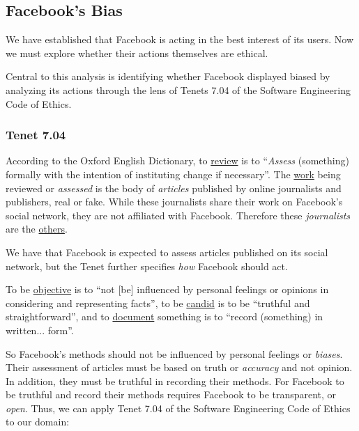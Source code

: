 
\subsection{Facebook's Bias}

\par We have established that Facebook is acting in the best interest of its users. Now we must explore whether their actions themselves are ethical.

\par Central to this analysis is identifying whether Facebook displayed biased by analyzing its actions through the lens of Tenets 7.04 of the Software Engineering Code of Ethics.

\subsubsection{Tenet 7.04}


\par According to the Oxford English Dictionary, to \ul{review} is to ``\emph{Assess} (something) formally with the intention of instituting change if necessary''. \cite{oxford} The \ul{work} being reviewed or \emph{assessed} is the body of \emph{articles} published by online journalists and publishers, real or fake. While these journalists share their work on Facebook's social network, they are not affiliated with Facebook. Therefore these \emph{journalists} are the \ul{others}.

\par We have that Facebook is expected to assess articles published on its social network, but the Tenet further specifies \emph{how} Facebook should act. 

\par To be \ul{objective} is to ``not [be] influenced by personal feelings or opinions in considering and representing facts'', \cite{oxford} to be \ul{candid} is to be ``truthful and straightforward'', \cite{oxford} and to \ul{document} something is to ``record (something) in written... form''. \cite{oxford}

\par So Facebook's methods should not be influenced by personal feelings or \emph{biases}. Their assessment of articles must be based on truth or \emph{accuracy} and not opinion. In addition, they must be truthful in recording their methods. For Facebook to be truthful and record their methods requires Facebook to be transparent, or \emph{open}. Thus, we can apply Tenet 7.04 of the Software Engineering Code of Ethics to our domain:

